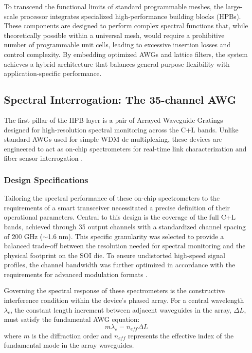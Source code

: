 To transcend the functional limits of standard programmable meshes, the large-scale processor 
integrates specialized high-performance building blocks (HPBs). These components are designed to 
perform complex spectral functions that, while theoretically possible within a universal mesh, would 
require a prohibitive number of programmable unit cells, leading to excessive insertion losses 
and control complexity. By embedding optimized AWGs and lattice filters, the system achieves a 
hybrid architecture that balances general-purpose flexibility with application-specific performance.

\subsection{Spectral Interrogation: The 35-channel AWG}
\label{subsec:awg_design}

The first pillar of the HPB layer is a pair of Arrayed Waveguide Gratings designed for 
high-resolution spectral monitoring across the C+L bands. Unlike standard AWGs used for simple WDM 
de-multiplexing, these devices are engineered to act as on-chip spectrometers for real-time link 
characterization and fiber sensor interrogation \cite{younOpticalFrequencyMonitoring2001}.

\subsubsection{Design Specifications}

Tailoring the spectral performance of these on-chip spectrometers to the requirements of a smart 
transceiver necessitated a precise definition of their operational parameters. Central to this 
design is the coverage of the full C+L bands, achieved through 35 output channels with a 
standardized channel spacing of 200 GHz ($\sim$1.6 nm). This specific granularity was selected to 
provide a balanced trade-off between the resolution needed for spectral monitoring and the physical 
footprint on the SOI die. To ensure undistorted high-speed signal profiles, the channel bandwidth 
was further optimized in accordance with the requirements for advanced modulation formats 
\cite{chungDemonstrationBidirectionallyTunable2022}.

Governing the spectral response of these spectrometers is the constructive interference condition 
within the device's phased array. For a central wavelength $\lambda_c$, the constant length increment 
between adjacent waveguides in the array, $\Delta L$, must satisfy the fundamental AWG equation:
\begin{equation}
    m \lambda_c = n_{eff} \Delta L
\end{equation}
where $m$ is the diffraction order and $n_{eff}$ represents the effective index of the fundamental 
mode in the array waveguides.

